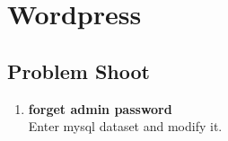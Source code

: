 \section{Wordpress}
    \subsection{Problem Shoot}
        \begin{enumerate}
            \item \textbf{forget admin password} \\
            Enter mysql dataset and modify it.
        \end{enumerate}